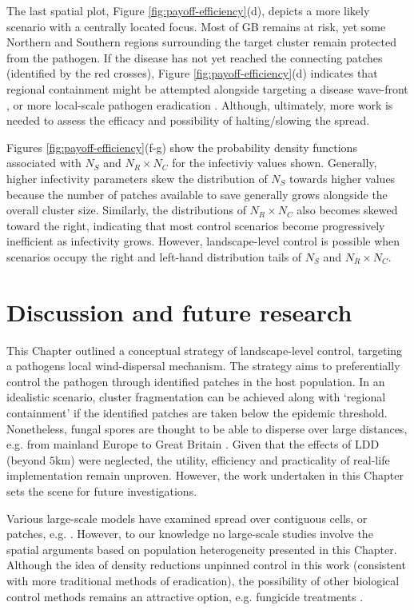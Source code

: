 The last spatial plot, Figure \ref{fig:payoff-efficiency}(d), depicts a more likely scenario with a centrally located focus.
Most of GB remains at risk, yet some Northern and Southern regions surrounding the target cluster remain protected from the pathogen.
If the disease has not yet reached the connecting patches (identified by the red crosses), Figure \ref{fig:payoff-efficiency}(d) indicates that regional containment might be attempted alongside targeting a disease wave-front \cite{large-scale-control}, or more local-scale pathogen eradication \cite{WEBIDEMICS}. 
Although, ultimately, more work is needed to assess the efficacy and possibility of halting/slowing the spread.

Figures \ref{fig:payoff-efficiency}(f-g) show the probability density functions associated with $N_S$ and $N_R \times N_C$ for the infectiviy values shown.
Generally, higher infectivity parameters skew the distribution of $N_S$ towards higher values because the number of patches available to save generally grows alongside the overall cluster size.
Similarly, the distributions of $N_R \times N_C$ also becomes skewed toward the right, indicating that most control scenarios become progressively inefficient as infectivity grows.
However, landscape-level control is possible when scenarios occupy the right and left-hand distribution tails of $N_S$ and $N_R \times N_C$.

\section{Discussion and future research}

This Chapter outlined a conceptual strategy of landscape-level control, targeting a pathogens local wind-dispersal mechanism.
The strategy aims to preferentially control the pathogen through identified patches in the host population. 
In an idealistic scenario, cluster fragmentation can be achieved along with `regional containment' if the identified patches are taken below the epidemic threshold.
Nonetheless, fungal spores are thought to be able to disperse over large distances, e.g. from mainland Europe to Great Britain \cite{wylder2018evidence, freer2017tree}.
Given that the effects of LDD (beyond $5\mathrm{km}$) were neglected, the utility, efficiency and practicality of real-life implementation remain unproven. However, the work undertaken in this Chapter sets the scene for future investigations.

Various large-scale models have examined spread over contiguous cells, or patches, e.g. \cite{gaydos2019forecasting, large-scale-control, meentemeyer2011epidemiological}.
However, to our knowledge no large-scale studies involve the spatial arguments based on population heterogeneity presented in this Chapter.
Although the idea of density reductions unpinned control in this work (consistent with more traditional methods of eradication),
the possibility of other biological control methods remains an attractive option, e.g. fungicide treatments \cite{hauptman2015application}.

